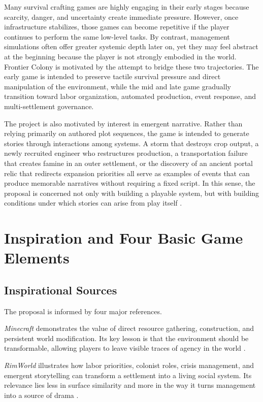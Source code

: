 \documentclass[conference]{IEEEtran}
\begin{document}
Many survival crafting games are highly engaging in their early stages because scarcity, danger, and uncertainty create immediate pressure. However, once infrastructure stabilizes, those games can become repetitive if the player continues to perform the same low-level tasks. By contrast, management simulations often offer greater systemic depth later on, yet they may feel abstract at the beginning because the player is not strongly embodied in the world. Frontier Colony is motivated by the attempt to bridge these two trajectories. The early game is intended to preserve tactile survival pressure and direct manipulation of the environment, while the mid and late game gradually transition toward labor organization, automated production, event response, and multi-settlement governance.

The project is also motivated by interest in emergent narrative. Rather than relying primarily on authored plot sequences, the game is intended to generate stories through interactions among systems. A storm that destroys crop output, a newly recruited engineer who restructures production, a transportation failure that creates famine in an outer settlement, or the discovery of an ancient portal relic that redirects expansion priorities all serve as examples of events that can produce memorable narratives without requiring a fixed script. In this sense, the proposal is concerned not only with building a playable system, but with building conditions under which stories can arise from play itself \cite{schell2020,adams2014}.

\section{Inspiration and Four Basic Game Elements}
\subsection{Inspirational Sources}
The proposal is informed by four major references.

\textit{Minecraft} demonstrates the value of direct resource gathering, construction, and persistent world modification. Its key lesson is that the environment should be transformable, allowing players to leave visible traces of agency in the world \cite{minecraft}.

\textit{RimWorld} illustrates how labor priorities, colonist roles, crisis management, and emergent storytelling can transform a settlement into a living social system. Its relevance lies less in surface similarity and more in the way it turns management into a source of drama \cite{rimworld}.
\end{document}
